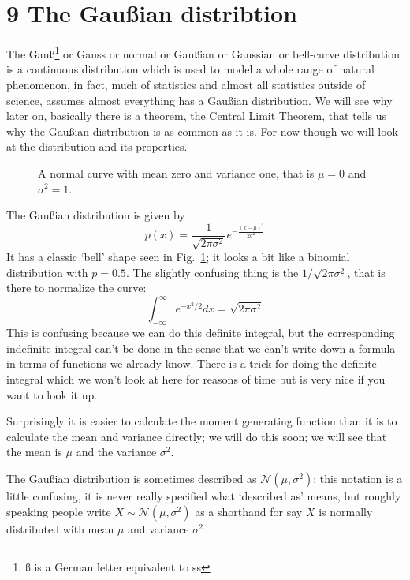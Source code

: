 \documentclass[11pt,a4paper]{scrartcl}
\begin{document}
\section*{9 The Gau\ss{}ian distribtion}

The Gau\ss\footnote{\ss{} is a German letter equivalent to ss} or Gauss
or normal or Gau\ss{}ian or Gaussian or bell-curve distribution is a
continuous distribution which is used to model a whole range of
natural phenomenon, in fact, much of statistics and almost all
statistics outside of science, assumes almost everything has a
Gau\ss{}ian distribution. We will see why later on, basically there is
a theorem, the Central Limit Theorem, that tells us why the
Gau\ss{}ian distribution is as common as it is. For now though we will
look at the distribution and its properties.

\begin{figure}[tb]
\begin{center}

\end{center}
\caption{A normal curve with mean zero and variance one, that is $\mu=0$ and $\sigma^2=1$.\label{fig_gauss}}
\end{figure}

The Gau\ss{}ian distribution is given by
\begin{equation}
p(x)=\frac{1}{\sqrt{2\pi\sigma^2}}e^{-\frac{(x-\mu)^2}{2\sigma^2}}
\end{equation}
It has a classic \lq{}bell\rq{} shape seen in Fig.~\ref{fig_gauss}; it
looks a bit like a binomial distribution with $p=0.5$. The slightly
confusing thing is the $1/\sqrt{2\pi\sigma^2}$, that is there to normalize the curve:
\begin{equation}
\int_{-\infty}^\infty e^{-x^2/2}dx=\sqrt{2\pi\sigma^2}
\end{equation}
This is confusing because we can do this definite integral, but the
corresponding indefinite integral can't be done in the sense that we
can't write down a formula in terms of functions we already
know. There is a trick for doing the definite integral which we won't
look at here for reasons of time but is very nice if you want to look
it up.

Surprisingly it is easier to calculate the moment generating function
than it is to calculate the mean and variance directly; we will do
this soon; we will see that the mean is $\mu$ and the variance
$\sigma^2$.

The Gau\ss{}ian distribution is sometimes described as
$\mathcal{N}(\mu,\sigma^2)$; this notation is a little confusing, it is never
really specified what \lq{}described as\rq{} means, but roughly
speaking people write $X\sim \mathcal{N}(\mu,\sigma^2)$ as a shorthand for say
$X$ is normally distributed with mean $\mu$ and variance $\sigma^2$
\end{document}
